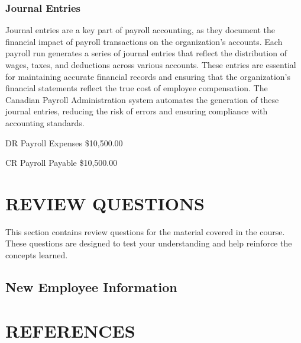 \documentclass[letterpaper,10pt,english]{sphinxmanual}
\begin{document}
\subsection{Journal Entries}
\label{\detokenize{payroll_accounting:id1}}
\sphinxAtStartPar
Journal entries are a key part of payroll accounting, as they document the financial impact of payroll transactions on the organization’s accounts. Each payroll run generates a series of journal entries that reflect the distribution of wages, taxes, and deductions across various accounts.
These entries are essential for maintaining accurate financial records and ensuring that the organization’s financial statements reflect the true cost of employee compensation. The Canadian Payroll Administration system automates the generation of these journal entries, reducing the risk of errors and ensuring compliance with accounting standards.

\begin{DUlineblock}{0em}
\item[] DR    Payroll Expenses    \$10,500.00
\item[]
\begin{DUlineblock}{\DUlineblockindent}
\item[] CR  Payroll Payable   \$10,500.00
\end{DUlineblock}
\end{DUlineblock}

\sphinxstepscope


\chapter{REVIEW QUESTIONS}
\label{\detokenize{review_questions:review-questions}}\label{\detokenize{review_questions::doc}}
\sphinxAtStartPar
This section contains review questions for the material covered in the course. These questions are designed to test your understanding and help reinforce the concepts learned.


\section{New Employee Information}
\label{\detokenize{review_questions:new-employee-information}}
\sphinxstepscope


\chapter{REFERENCES}
\label{\detokenize{references:references}}\label{\detokenize{references::doc}}
\sphinxstepscope
\end{document}
